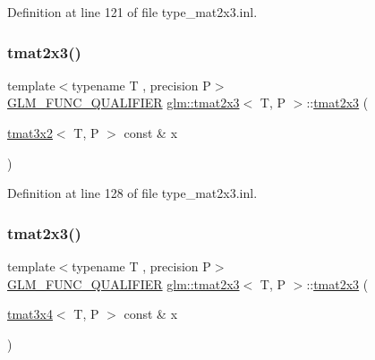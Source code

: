 Definition at line 121 of file type\+\_\+mat2x3.\+inl.

\mbox{\label{structglm_1_1tmat2x3_a2743481f193e33c3732697620ba9a0d7}} 
\subsubsection{\texorpdfstring{tmat2x3()}{tmat2x3()}\hspace{0.1cm}{\footnotesize\ttfamily [15/22]}}
{\footnotesize\ttfamily template$<$typename T , precision P$>$ \\
\mbox{\hyperlink{setup_8hpp_a33fdea6f91c5f834105f7415e2a64407}{G\+L\+M\+\_\+\+F\+U\+N\+C\+\_\+\+Q\+U\+A\+L\+I\+F\+I\+ER}} \mbox{\hyperlink{structglm_1_1tmat2x3}{glm\+::tmat2x3}}$<$ T, P $>$\+::\mbox{\hyperlink{structglm_1_1tmat2x3}{tmat2x3}} (\begin{DoxyParamCaption}\item[{\mbox{\hyperlink{structglm_1_1tmat3x2}{tmat3x2}}$<$ T, P $>$ const \&}]{x }\end{DoxyParamCaption})}



Definition at line 128 of file type\+\_\+mat2x3.\+inl.

\mbox{\label{structglm_1_1tmat2x3_aa2f1a3ee821a8ac9f2ee610a27b2786b}} 
\subsubsection{\texorpdfstring{tmat2x3()}{tmat2x3()}\hspace{0.1cm}{\footnotesize\ttfamily [16/22]}}
{\footnotesize\ttfamily template$<$typename T , precision P$>$ \\
\mbox{\hyperlink{setup_8hpp_a33fdea6f91c5f834105f7415e2a64407}{G\+L\+M\+\_\+\+F\+U\+N\+C\+\_\+\+Q\+U\+A\+L\+I\+F\+I\+ER}} \mbox{\hyperlink{structglm_1_1tmat2x3}{glm\+::tmat2x3}}$<$ T, P $>$\+::\mbox{\hyperlink{structglm_1_1tmat2x3}{tmat2x3}} (\begin{DoxyParamCaption}\item[{\mbox{\hyperlink{structglm_1_1tmat3x4}{tmat3x4}}$<$ T, P $>$ const \&}]{x }\end{DoxyParamCaption})}



